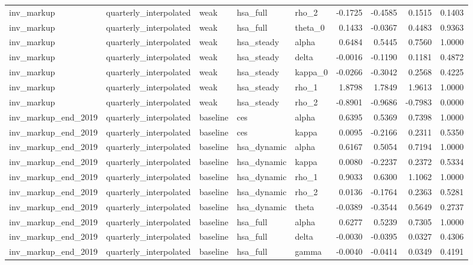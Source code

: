 \begin{tabular}{lllllrrrr}
inv\_markup & quarterly\_interpolated & weak & hsa\_full & rho\_2 & -0.1725 & -0.4585 & 0.1515 & 0.1403 \\
inv\_markup & quarterly\_interpolated & weak & hsa\_full & theta\_0 & 0.1433 & -0.0367 & 0.4483 & 0.9363 \\
inv\_markup & quarterly\_interpolated & weak & hsa\_steady & alpha & 0.6484 & 0.5445 & 0.7560 & 1.0000 \\
inv\_markup & quarterly\_interpolated & weak & hsa\_steady & delta & -0.0016 & -0.1190 & 0.1181 & 0.4872 \\
inv\_markup & quarterly\_interpolated & weak & hsa\_steady & kappa\_0 & -0.0266 & -0.3042 & 0.2568 & 0.4225 \\
inv\_markup & quarterly\_interpolated & weak & hsa\_steady & rho\_1 & 1.8798 & 1.7849 & 1.9613 & 1.0000 \\
inv\_markup & quarterly\_interpolated & weak & hsa\_steady & rho\_2 & -0.8901 & -0.9686 & -0.7983 & 0.0000 \\
inv\_markup\_end\_2019 & quarterly\_interpolated & baseline & ces & alpha & 0.6395 & 0.5369 & 0.7398 & 1.0000 \\
inv\_markup\_end\_2019 & quarterly\_interpolated & baseline & ces & kappa & 0.0095 & -0.2166 & 0.2311 & 0.5350 \\
inv\_markup\_end\_2019 & quarterly\_interpolated & baseline & hsa\_dynamic & alpha & 0.6167 & 0.5054 & 0.7194 & 1.0000 \\
inv\_markup\_end\_2019 & quarterly\_interpolated & baseline & hsa\_dynamic & kappa & 0.0080 & -0.2237 & 0.2372 & 0.5334 \\
inv\_markup\_end\_2019 & quarterly\_interpolated & baseline & hsa\_dynamic & rho\_1 & 0.9033 & 0.6300 & 1.1062 & 1.0000 \\
inv\_markup\_end\_2019 & quarterly\_interpolated & baseline & hsa\_dynamic & rho\_2 & 0.0136 & -0.1764 & 0.2363 & 0.5281 \\
inv\_markup\_end\_2019 & quarterly\_interpolated & baseline & hsa\_dynamic & theta & -0.0389 & -0.3544 & 0.5649 & 0.2737 \\
inv\_markup\_end\_2019 & quarterly\_interpolated & baseline & hsa\_full & alpha & 0.6277 & 0.5239 & 0.7305 & 1.0000 \\
inv\_markup\_end\_2019 & quarterly\_interpolated & baseline & hsa\_full & delta & -0.0030 & -0.0395 & 0.0327 & 0.4306 \\
inv\_markup\_end\_2019 & quarterly\_interpolated & baseline & hsa\_full & gamma & -0.0040 & -0.0414 & 0.0349 & 0.4191 \\

\end{tabular}
